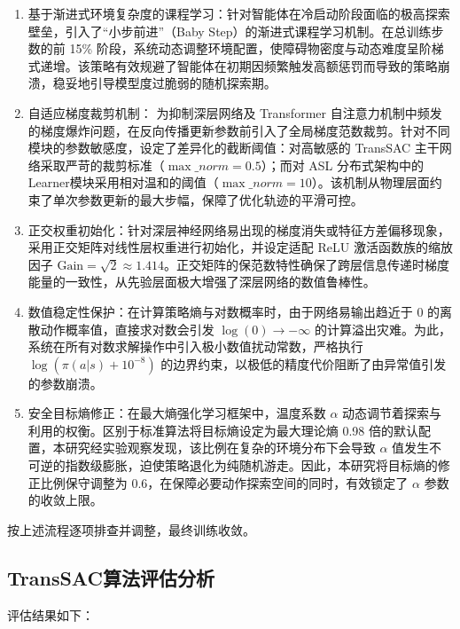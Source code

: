 \documentclass[
  oneside,
  degree=bachelor,
  fullwidthstop=false,
  fontset=fandol,
  times=false,
  minted=true,
  biblatex=true,
]{tongjithesis}
\begin{document}
\begin{enumerate}
    \item 基于渐进式环境复杂度的课程学习：针对智能体在冷启动阶段面临的极高探索壁垒，引入了“小步前进”（Baby Step）的渐进式课程学习机制。在总训练步数的前 15\% 阶段，系统动态调整环境配置，使障碍物密度与动态难度呈阶梯式递增。该策略有效规避了智能体在初期因频繁触发高额惩罚而导致的策略崩溃，稳妥地引导模型度过脆弱的随机探索期。
    
    \item 自适应梯度裁剪机制： 为抑制深层网络及 Transformer 自注意力机制中频发的梯度爆炸问题，在反向传播更新参数前引入了全局梯度范数裁剪。针对不同模块的参数敏感度，设定了差异化的截断阈值：对高敏感的 TransSAC 主干网络采取严苛的裁剪标准（$\max\_norm=0.5$）；而对 ASL 分布式架构中的Learner模块采用相对温和的阈值（$\max\_norm=10$）。该机制从物理层面约束了单次参数更新的最大步幅，保障了优化轨迹的平滑可控。
    
    \item 正交权重初始化：针对深层神经网络易出现的梯度消失或特征方差偏移现象，采用正交矩阵对线性层权重进行初始化，并设定适配 ReLU 激活函数族的缩放因子 $\text{Gain} = \sqrt{2} \approx 1.414$。正交矩阵的保范数特性确保了跨层信息传递时梯度能量的一致性，从先验层面极大增强了深层网络的数值鲁棒性。
    
    \item 数值稳定性保护：在计算策略熵与对数概率时，由于网络易输出趋近于 0 的离散动作概率值，直接求对数会引发 $\log(0) \to -\infty$ 的计算溢出灾难。为此，系统在所有对数求解操作中引入极小数值扰动常数，严格执行 $\log(\pi(a|s) + 10^{-8})$ 的边界约束，以极低的精度代价阻断了由异常值引发的参数崩溃。
    
    \item 安全目标熵修正：在最大熵强化学习框架中，温度系数 $\alpha$ 动态调节着探索与利用的权衡。区别于标准算法将目标熵设定为最大理论熵 0.98 倍的默认配置，本研究经实验观察发现，该比例在复杂的环境分布下会导致 $\alpha$ 值发生不可逆的指数级膨胀，迫使策略退化为纯随机游走。因此，本研究将目标熵的修正比例保守调整为 0.6，在保障必要动作探索空间的同时，有效锁定了 $\alpha$ 参数的收敛上限。
\end{enumerate}

按上述流程逐项排查并调整，最终训练收敛。

\subsection{TransSAC算法评估分析}

评估结果如下：
\end{document}
